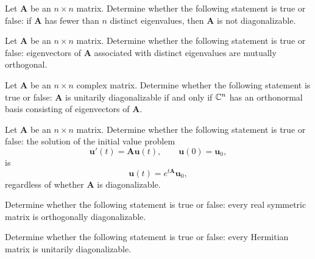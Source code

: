\documentclass[11pt,oneside]{article}
\begin{document}
\begin{problem}
Let $\mathbf A$ be an $n\times n$ matrix. Determine whether the following statement is true or false: if $\mathbf A$ has fewer than $n$ distinct eigenvalues, then $\mathbf A$ is not diagonalizable.
\end{problem}

\begin{problem}
Let $\mathbf A$ be an $n\times n$ matrix. Determine whether the following statement is true or false: eigenvectors of $\mathbf A$ associated with distinct eigenvalues are mutually orthogonal.
\end{problem}

\begin{problem}
Let $\mathbf A$ be an $n\times n$ complex matrix. Determine whether the following statement is true or false: $\mathbf A$ is unitarily diagonalizable if and only if $\mathbb{C}^n$ has an orthonormal basis consisting of eigenvectors of $\mathbf A$.
\end{problem}

\begin{problem}
Let $\mathbf A$ be an $n\times n$ matrix. Determine whether the following statement is true or false: the solution of the initial value problem
\[
\mathbf u'(t)=\mathbf A\mathbf u(t),
\qquad
\mathbf u(0)=\mathbf u_0,
\]
is
\[
\mathbf u(t)=e^{t\mathbf A}\mathbf u_0,
\]
regardless of whether $\mathbf A$ is diagonalizable.
\end{problem}

\begin{problem}
Determine whether the following statement is true or false: every real symmetric matrix is orthogonally diagonalizable.
\end{problem}

\begin{problem}
Determine whether the following statement is true or false: every Hermitian matrix is unitarily diagonalizable.
\end{problem}
\end{document}
